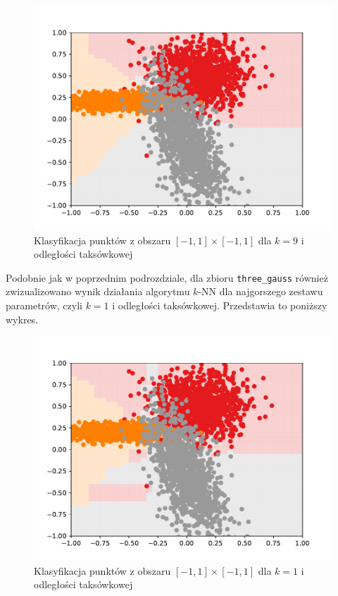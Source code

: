 \documentclass[11pt,a4paper]{article}
\begin{document}
\begin{figure}[H]
  \centering
  \includegraphics[width=.8\textwidth]{res/gauss-manhattan-9.pdf}
  \caption{Klasyfikacja punktów z obszaru $[-1,1] \times [-1,1]$ dla $k = 9$ i odległości taksówkowej}
  \label{fig:gauss-manhattan-9}
\end{figure}

\newpage

Podobnie jak w poprzednim podrozdziale, dla zbioru {\tt three\_gauss} również zwizualizowano wynik działania algorytmu $k$-NN dla najgorszego zestawu parametrów, czyli $k=1$ i odległości taksówkowej. Przedstawia to poniższy wykres.

\begin{figure}[H]
  \centering
  \includegraphics[width=.8\textwidth]{res/gauss-manhattan-1.pdf}
  \caption{Klasyfikacja punktów z obszaru $[-1,1] \times [-1,1]$ dla $k = 1$ i odległości taksówkowej}
  \label{fig:gauss-manhattan-1}
\end{figure}
\end{document}
